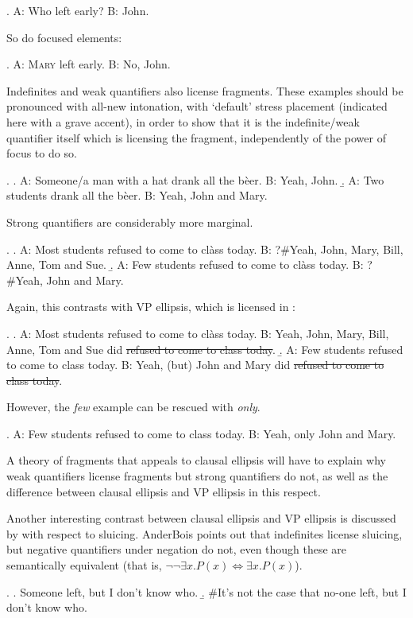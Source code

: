 \documentclass[doublespace]{umthesis}
\begin{document}
\ex. 	A: Who left early? B: John.

So do focused elements:

\ex.  A: \textsc{Mary} left early. B: No, John.

Indefinites and weak quantifiers also license fragments. These examples should be pronounced with all-new intonation, with `default' stress placement (indicated here with a grave accent), in order to show that it is the indefinite/weak quantifier itself which is licensing the fragment, independently of the power of focus to do so.

\ex.	\a. A: Someone/a man with a hat drank all the b\`eer. B: Yeah, John.
	\b. A: Two students drank all the b\`eer. B: Yeah, John and Mary.
	
Strong quantifiers are considerably more marginal.

\ex. 	\a. A: Most students refused to come to cl\`ass today. B: ?\#Yeah, John, Mary, Bill, Anne, Tom and Sue.
	\b. A: Few students refused to come to cl\`ass today. B: ?\#Yeah, John and Mary.
	
Again, this contrasts with VP ellipsis, which is licensed in \Last:

\ex. 	\a. A: Most students refused to come to cl\`ass today. B: Yeah, John, Mary, Bill, Anne, Tom and Sue did \sout{refused to come to class today}.
	\b. A: Few students refused to come to class today. B: Yeah, (but) John and Mary did \sout{refused to come to class today}.

However, the {\it few} example can be rescued with {\it only}.

\ex. 	A: Few students refused to come to class today. B: Yeah, only John and Mary. 

A theory of fragments that appeals to clausal ellipsis will have to explain why weak quantifiers license fragments but strong quantifiers do not, as well as the difference between clausal ellipsis and VP ellipsis in this respect.

Another interesting contrast between clausal ellipsis and VP ellipsis is discussed by \cite{AB10} with respect to sluicing. AnderBois points out that indefinites license sluicing, but negative quantifiers under negation do not, even though these are semantically equivalent (that is, $\neg \neg \exists x. P(x) \Leftrightarrow \exists x. P(x)$).

\ex. 		\label{indefsluicing}
		\a. \label{indefsluicinga}Someone left, but I don't know who.
		\b. \label{indefsluicingb}\#It's not the case that no-one left, but I don't know who.
		
\end{document}
